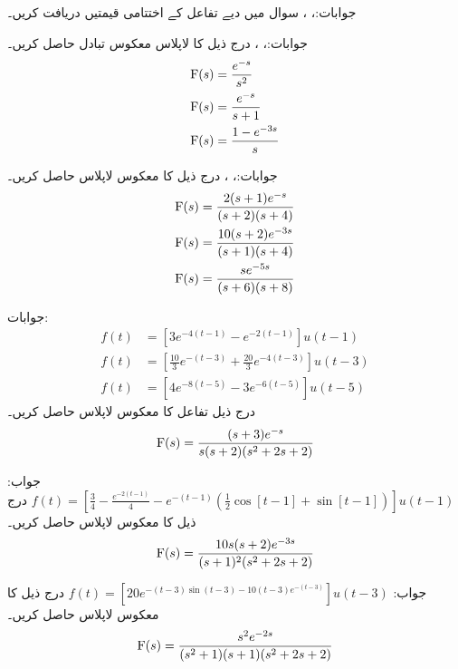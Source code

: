 جوابات:، ، 
سوال  میں دیے تفاعل کے اختتامی قیمتیں دریافت کریں۔

جوابات:، ، 
درج ذیل کا لاپلاس معکوس تبادل حاصل کریں۔
\begin{align*}
{\ensuremath{{\textup{F}}}}(s)&=\frac{e^{-s}}{s^2}\\
{{\textup{F}}}(s)&=\frac{e^{-s}}{s+1}\\
{{\textup{F}}}(s)&=\frac{1-e^{-3s}}{s}
\end{align*}

جوابات:، ، 
درج ذیل کا معکوس لاپلاس حاصل کریں۔
\begin{align*}
{\ensuremath{{\textup{F}}}}(s)&=\frac{2(s+1)e^{-s}}{(s+2)(s+4)}\\
{{\textup{F}}}(s)&=\frac{10(s+2)e^{-3s}}{(s+1)(s+4)}\\
{{\textup{F}}}(s)&=\frac{se^{-5s}}{(s+6)(s+8)}
\end{align*}

جوابات:
\begin{align*}
f(t)&=\left[3e^{-4(t-1)}-e^{-2(t-1)}\right]u(t-1)\\
f(t)&=\left[\frac{10}{3}e^{-(t-3)}+\frac{20}{3}e^{-4(t-3)}\right]u(t-3)\\
f(t)&=\left[4e^{-8(t-5)}-3e^{-6(t-5)}\right]u(t-5)
\end{align*}
درج ذیل تفاعل کا معکوس لاپلاس حاصل کریں۔
\begin{align*}
{\ensuremath{{\textup{F}}}}(s)=\frac{(s+3)e^{-s}}{s(s+2)(s^2+2s+2)}
\end{align*}

جواب:
$f(t)=\left[\frac{3}{4}-\frac{e^{-2(t-1)}}{4}-e^{-(t-1)}\left(\frac{1}{2}\cos [t-1]+\sin [t-1]\right)\right]u(t-1)$
درج ذیل کا معکوس لاپلاس حاصل کریں۔
\begin{align*}
{\ensuremath{{\textup{F}}}}(s)=\frac{10s(s+2)e^{-3s}}{(s+1)^2(s^2+2s+2)}
\end{align*}

جواب:
$f(t)=\left[20e^{-(t-3)\sin(t-3)-10(t-3)e^{-(t-3)}}\right]u(t-3)$
درج ذیل کا معکوس لاپلاس حاصل کریں۔
\begin{align*}
{\ensuremath{{\textup{F}}}}(s)=\frac{s^2e^{-2s}}{(s^2+1)(s+1)(s^2+2s+2)}
\end{align*}

